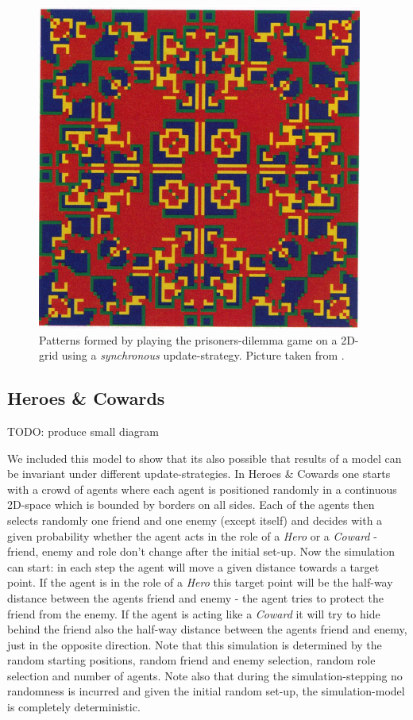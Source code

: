 \begin{figure}[H]
	\centering
  \includegraphics[width=.4\textwidth, angle=0]{./fig/sync_patterns.png}
	\caption{Patterns formed by playing the prisoners-dilemma game on a 2D-grid using a \textit{synchronous} update-strategy. Picture taken from \cite{huberman_evolutionary_1993}.}
	\label{fig:sync_patterns}
\end{figure}


\subsection{Heroes \& Cowards}
TODO: produce small diagram

We included this model to show that its also possible that results of a model can be invariant under different update-strategies. In Heroes \& Cowards one starts with a crowd of agents where each agent is positioned randomly in a continuous 2D-space which is bounded by borders on all sides. Each of the agents then selects randomly one friend and one enemy (except itself) and decides with a given probability whether the agent acts in the role of a \textit{Hero} or a \textit{Coward} - friend, enemy and role don't change after the initial set-up. Now the simulation can start: in each step the agent will move a given distance towards a target point. If the agent is in the role of a \textit{Hero} this target point will be the half-way distance between the agents friend and enemy - the agent tries to protect the friend from the enemy. If the agent is acting like a \textit{Coward} it will try to hide behind the friend also the half-way distance between the agents friend and enemy, just in the opposite direction. Note that this simulation is determined by the random starting positions, random friend and enemy selection, random role selection and number of agents. Note also that during the simulation-stepping no randomness is incurred and given the initial random set-up, the simulation-model is completely deterministic.

